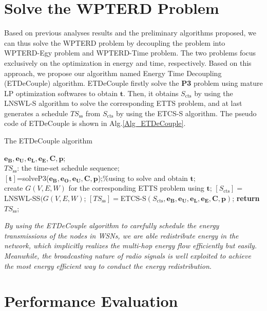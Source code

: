 \documentclass[journal,10pt]{IEEEtran}
\begin{document}
\section{Solve the WPTERD Problem}

Based on previous analyses results and the preliminary algorithms proposed, we can thus solve the WPTERD problem by decoupling the problem into WPTERD-Egy problem and WPTERD-Time problem. The two problems focus exclusively on the optimization in energy and time, respectively. Based on this approach, we propose our algorithm named Energy Time Decoupling (ETDeCouple) algorithm. ETDeCouple firstly solve the \textbf{P3} problem using mature LP optimization softwares to obtain $\mathbf{t}$. Then, it obtains $S_\text{cts}$ by using the LNSWL-S algorithm to solve the corresponding ETTS problem, and at last generates a schedule $TS_\text{ss}$ from $S_\text{cts}$ by using the ETCS-S algorithm. The pseudo code of ETDeCouple is shown in Alg.\ref{Alg_ETDeCouple}.

\begin{algorithm}[!htb]
\caption{The ETDeCouple algorithm}
\begin{algorithmic}[1]\label{Alg_ETDeCouple}
    \REQUIRE $\mathbf{e_B}, \mathbf{e_U}, \mathbf{e_L}, \mathbf{e_E}, \mathbf{C}, \mathbf{p}$;\\
    \ENSURE $TS_\text{ss}$: the time-set schedule sequence;\\
    \STATE $[\mathbf{t}]${=}solveP3($\mathbf{e_B}, \mathbf{e_O},\mathbf{e_U},\mathbf{C}, \mathbf{p}$);\%using  to solve and obtain $\mathbf{t}$;\\
    \STATE create $G(V,E,W)$ for the corresponding ETTS problem using $\mathbf{t}$;
    \STATE $[S_\text{cts}]{=}$LNSWL-SS$(G(V,E,W)$;
    \STATE $[TS_\text{ss}]{=}$ETCS-S$(S_\text{cts},\mathbf{e_B}, \mathbf{e_U}, \mathbf{e_L}, \mathbf{e_E}, \mathbf{C}, \mathbf{p})$;
     \STATE \textbf{return} $TS_\text{ss}$;
\end{algorithmic}
\end{algorithm}

\textit{By using the ETDeCouple algorithm to carefully schedule the energy transmissions of the nodes in WSNs, we are able redistribute energy in the network, which implicitly realizes the multi-hop energy flow efficiently but easily. Meanwhile, the broadcasting nature of radio signals is well exploited to achieve the most energy efficient way to conduct the energy redistribution}.

\section{Performance Evaluation}
\label{sec_sim}
\end{document}
